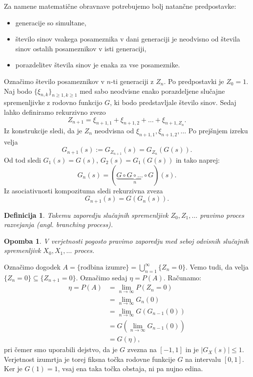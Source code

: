\documentclass[10pt, a4paper]{article}
\newtheorem{defi}[izr]{Definicija}
\newenvironment{noticeB}{%
  \tcolorbox[%
  notitle,
  empty,
  enhanced,  %
  breakable,
  coltext=black,
  colback=white, 
  fontupper=\rmfamily,
  noparskip,
  sharp corners,
  boxrule=-1pt,  %
  frame hidden,
  left=7pt,  %
  right=7pt,
  top=5pt,
  bottom=5pt,
  before skip=2.5ex plus 2pt,
  after skip=2.5ex plus 2pt,
  borderline west = {1.5pt}{-0.1pt}{blue!30!black}, %
  overlay unbroken and last={%
    \draw[color=black, line width=1.25pt]
    ($(frame.south west)+(1.pt, -0.1pt)$) -- ++(2em, 0);
  }
  ]}
{\endtcolorbox}
\newenvironment{definicija}{\begin{noticeB}\begin{defi}}{%
    \end{defi}\end{noticeB}}
\newtheorem*{opomba}{Opomba}
\begin{document}
Za namene matematične obravnave potrebujemo bolj natančne predpostavke:
\begin{itemize}
  \item generacije so simultane,
  \item število sinov vsakega posameznika v dani generaciji je neodvisno od števila sinov ostalih posameznikov v isti generaciji,
  \item porazdelitev števila sinov je enaka za vse posameznike.
\end{itemize}
Označimo število posameznikov v $n$-ti generaciji z $Z_n$.
Po predpostavki je $Z_0 = 1$.
Naj bodo $\{\xi_{n, k}\}_{n \geq 1, k \geq 1}$ med sabo neodvisne enako porazdeljene slučajne spremenljivke z rodovno funkcijo $G$,
ki bodo predstavljale število sinov. Sedaj lahko definiramo rekurzivno zvezo 
$$Z_{n + 1} = \xi_{n + 1, 1} + \xi_{n + 1, 2} + \dots + \xi_{n + 1, Z_n}.$$
Iz konstrukcije sledi, da je $Z_n$ neodvisna od $\xi_{n + 1, 1}, \xi_{n + 1, 2}, \dots$
Po prejšnjem izreku velja 
$$G_{n+1} (s) := G_{Z_{n + 1}} (s) = G_{Z_n} (G(s)).$$
Od tod sledi $G_1 (s) = G(s)$, $G_2 (s) = G_1 (G(s))$ in tako naprej:
$$G_n(s) = (\underbrace{G \circ G \circ \dots \circ G}_{n})(s).$$
Iz asociativnosti kompozituma sledi rekurzivna zveza
$$G_{n + 1} (s) = G(G_n (s)).$$

\begin{definicija}
  Takemu zaporedju slučajnih spremenljivk $Z_0, Z_1, \dots$ pravimo proces razvejanja (angl. \emph{branching process}).
\end{definicija}

\begin{opomba}
  V verjetnosti pogosto pravimo zaporedju med seboj odvisnih slučajnih spremenljivk 
  $X_0, X_1, \dots$ proces.
\end{opomba}

Označimo dogodek $A = \{\text{rodbina izumre}\} = \bigcup_{n = 1} ^\infty \{Z_n = 0\}$.
Vemo tudi, da velja $\{Z_n = 0\} \subseteq \{Z_{n + 1} = 0\}$.
Označimo sedaj $\eta = P(A)$. Računamo:
\begin{align*}
  \eta = P(A) &= \lim_{n \to \infty} P(Z_n = 0)\\
  &= \lim_{n \to \infty} G_{n} (0)\\
  &= \lim_{n \to \infty} G(G_{n - 1} (0))\\
  &= G(\lim_{n \to \infty} G_{n - 1} (0))\\
  &= G(\eta),
\end{align*}
pri čemer smo uporabili dejstvo, da je $G$ zvezna na $[-1, 1]$ in je $|G_X (s)| \leq 1$.
Verjetnost izumrtja je torej fiksna točka rodovne funkcije $G$ na intervalu $[0, 1]$.
Ker je $G(1) = 1$, vsaj ena taka točka obstaja, ni pa nujno edina.
\end{document}
